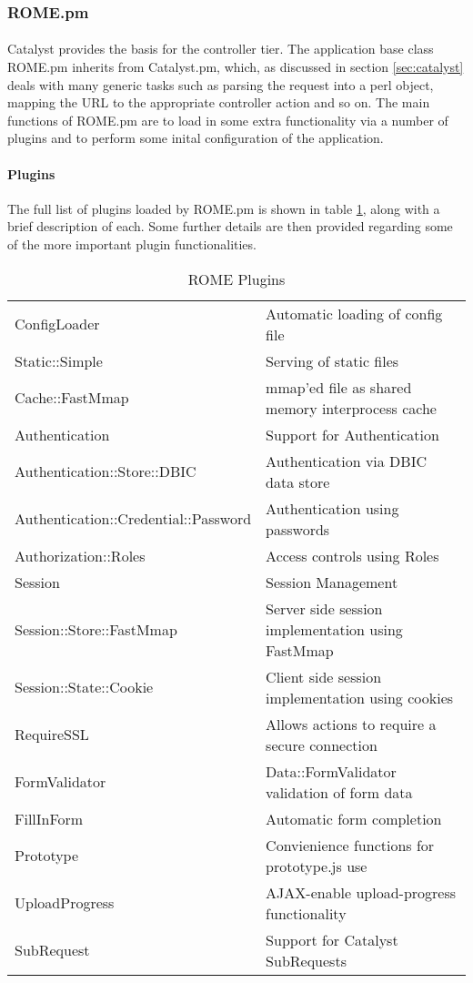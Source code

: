 \subsubsection{ROME.pm}
\label{sec:controller_rome_pm}

\paragraph{}
Catalyst provides the basis for the controller tier. The application base class ROME.pm inherits from Catalyst.pm, which, as discussed in section \ref{sec:catalyst} deals with many generic tasks such as parsing the request into a perl object, mapping the URL to the appropriate controller action and so on. The main functions of ROME.pm are to load in some extra functionality via a number of plugins and to perform some inital configuration of the application.

\paragraph{Plugins}
The full list of plugins loaded by ROME.pm is shown in table \ref{tab:plugins}, along with a brief description of each. Some further details are then provided regarding some of the more important plugin functionalities.


\begin{table}
\caption{ROME Plugins}
\label{tab:plugins}
\begin{footnotesize}
\begin{tabular}{ll}
ConfigLoader & Automatic loading of config file\\
Static::Simple & Serving of static files\\
Cache::FastMmap & mmap'ed file as shared memory interprocess cache\\
Authentication &  Support for Authentication\\
Authentication::Store::DBIC & Authentication via DBIC data store\\
Authentication::Credential::Password & Authentication using passwords\\
Authorization::Roles & Access controls using Roles\\
Session & Session Management\\
Session::Store::FastMmap & Server side session implementation using FastMmap\\
Session::State::Cookie & Client side session implementation using cookies\\
RequireSSL & Allows actions to require a secure connection\\
FormValidator & Data::FormValidator validation of form data\\
FillInForm & Automatic form completion\\
Prototype & Convienience functions for prototype.js use\\
UploadProgress & AJAX-enable upload-progress functionality\\
SubRequest & Support for Catalyst SubRequests\\
\end{tabular}
\end{footnotesize}
\end{table}

